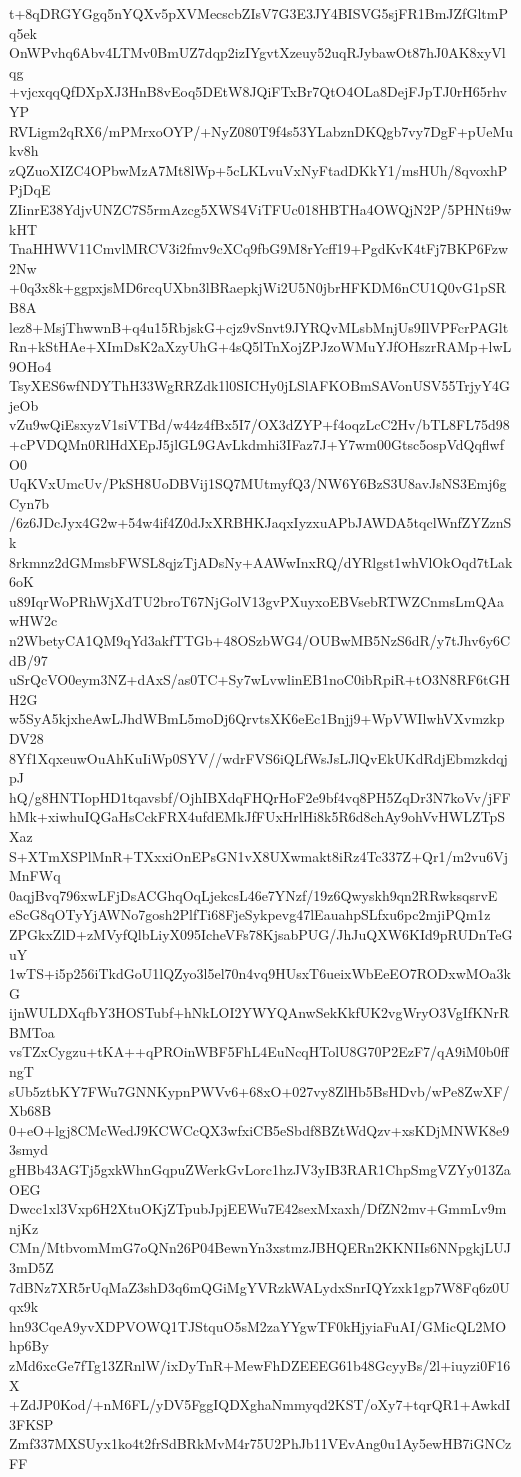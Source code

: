 t+8qDRGYGgq5nYQXv5pXVMecscbZIsV7G3E3JY4BISVG5sjFR1BmJZfGltmPq5ek
OnWPvhq6Abv4LTMv0BmUZ7dqp2izIYgvtXzeuy52uqRJybawOt87hJ0AK8xyVlqg
+vjcxqqQfDXpXJ3HnB8vEoq5DEtW8JQiFTxBr7QtO4OLa8DejFJpTJ0rH65rhvYP
RVLigm2qRX6/mPMrxoOYP/+NyZ080T9f4s53YLabznDKQgb7vy7DgF+pUeMukv8h
zQZuoXIZC4OPbwMzA7Mt8lWp+5cLKLvuVxNyFtadDKkY1/msHUh/8qvoxhPPjDqE
ZIinrE38YdjvUNZC7S5rmAzcg5XWS4ViTFUc018HBTHa4OWQjN2P/5PHNti9wkHT
TnaHHWV11CmvlMRCV3i2fmv9cXCq9fbG9M8rYcff19+PgdKvK4tFj7BKP6Fzw2Nw
+0q3x8k+ggpxjsMD6rcqUXbn3lBRaepkjWi2U5N0jbrHFKDM6nCU1Q0vG1pSRB8A
lez8+MsjThwwnB+q4u15RbjskG+cjz9vSnvt9JYRQvMLsbMnjUs9IlVPFcrPAGlt
Rn+kStHAe+XImDsK2aXzyUhG+4sQ5lTnXojZPJzoWMuYJfOHszrRAMp+lwL9OHo4
TsyXES6wfNDYThH33WgRRZdk1l0SICHy0jLSlAFKOBmSAVonUSV55TrjyY4GjeOb
vZu9wQiEsxyzV1siVTBd/w44z4fBx5I7/OX3dZYP+f4oqzLcC2Hv/bTL8FL75d98
+cPVDQMn0RlHdXEpJ5jlGL9GAvLkdmhi3IFaz7J+Y7wm00Gtsc5ospVdQqflwfO0
UqKVxUmcUv/PkSH8UoDBVij1SQ7MUtmyfQ3/NW6Y6BzS3U8avJsNS3Emj6gCyn7b
/6z6JDcJyx4G2w+54w4if4Z0dJxXRBHKJaqxIyzxuAPbJAWDA5tqclWnfZYZznSk
8rkmnz2dGMmsbFWSL8qjzTjADsNy+AAWwInxRQ/dYRlgst1whVlOkOqd7tLak6oK
u89IqrWoPRhWjXdTU2broT67NjGolV13gvPXuyxoEBVsebRTWZCnmsLmQAawHW2c
n2WbetyCA1QM9qYd3akfTTGb+48OSzbWG4/OUBwMB5NzS6dR/y7tJhv6y6CdB/97
uSrQcVO0eym3NZ+dAxS/as0TC+Sy7wLvwlinEB1noC0ibRpiR+tO3N8RF6tGHH2G
w5SyA5kjxheAwLJhdWBmL5moDj6QrvtsXK6eEc1Bnjj9+WpVWIlwhVXvmzkpDV28
8Yf1XqxeuwOuAhKuIiWp0SYV//wdrFVS6iQLfWsJsLJlQvEkUKdRdjEbmzkdqjpJ
hQ/g8HNTIopHD1tqavsbf/OjhIBXdqFHQrHoF2e9bf4vq8PH5ZqDr3N7koVv/jFF
hMk+xiwhuIQGaHsCckFRX4ufdEMkJfFUxHrlHi8k5R6d8chAy9ohVvHWLZTpSXaz
S+XTmXSPlMnR+TXxxiOnEPsGN1vX8UXwmakt8iRz4Tc337Z+Qr1/m2vu6VjMnFWq
0aqjBvq796xwLFjDsACGhqOqLjekcsL46e7YNzf/19z6Qwyskh9qn2RRwksqsrvE
eScG8qOTyYjAWNo7gosh2PlfTi68FjeSykpevg47lEauahpSLfxu6pc2mjiPQm1z
ZPGkxZlD+zMVyfQlbLiyX095IcheVFs78KjsabPUG/JhJuQXW6KId9pRUDnTeGuY
1wTS+i5p256iTkdGoU1lQZyo3l5el70n4vq9HUsxT6ueixWbEeEO7RODxwMOa3kG
ijnWULDXqfbY3HOSTubf+hNkLOI2YWYQAnwSekKkfUK2vgWryO3VgIfKNrRBMToa
vsTZxCygzu+tKA++qPROinWBF5FhL4EuNcqHTolU8G70P2EzF7/qA9iM0b0ffngT
sUb5ztbKY7FWu7GNNKypnPWVv6+68xO+027vy8ZlHb5BsHDvb/wPe8ZwXF/Xb68B
0+eO+lgj8CMcWedJ9KCWCcQX3wfxiCB5eSbdf8BZtWdQzv+xsKDjMNWK8e93smyd
gHBb43AGTj5gxkWhnGqpuZWerkGvLorc1hzJV3yIB3RAR1ChpSmgVZYy013ZaOEG
Dwcc1xl3Vxp6H2XtuOKjZTpubJpjEEWu7E42sexMxaxh/DfZN2mv+GmmLv9mnjKz
CMn/MtbvomMmG7oQNn26P04BewnYn3xstmzJBHQERn2KKNIIs6NNpgkjLUJ3mD5Z
7dBNz7XR5rUqMaZ3shD3q6mQGiMgYVRzkWALydxSnrIQYzxk1gp7W8Fq6z0Uqx9k
hn93CqeA9yvXDPVOWQ1TJStquO5sM2zaYYgwTF0kHjyiaFuAI/GMicQL2MOhp6By
zMd6xcGe7fTg13ZRnlW/ixDyTnR+MewFhDZEEEG61b48GcyyBs/2l+iuyzi0F16X
+ZdJP0Kod/+nM6FL/yDV5FggIQDXghaNmmyqd2KST/oXy7+tqrQR1+AwkdI3FKSP
Zmf337MXSUyx1ko4t2frSdBRkMvM4r75U2PhJb11VEvAng0u1Ay5ewHB7iGNCzFF
